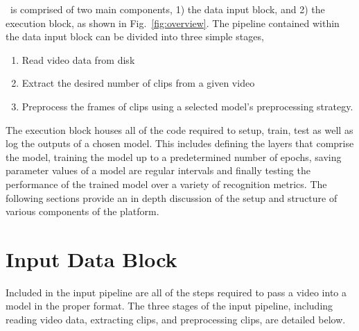 \documentclass{llncs}
\begin{document}
\acro~is comprised of two main components, 1) the data input block, and 2) the execution block, as shown in Fig.~\ref{fig:overview}. 
The pipeline contained within the data input block can be divided into three simple stages,
\begin{enumerate}
\item Read video data from disk
\item Extract the desired number of clips from a given video
\item Preprocess the frames of clips using a selected model's preprocessing strategy.
\end{enumerate}
The execution block houses all of the code required to setup, train, test as well as log the outputs of a chosen model.
This includes defining the layers that comprise the model, training the model up to a predetermined number of epochs, saving parameter values of a model are regular intervals and finally testing the performance of the trained model over a variety of recognition metrics.
The following sections provide an in depth discussion of the setup and structure of various components of the platform.

\section{Input Data Block}
\label{sec:ipblock}
Included in the input pipeline are all of the steps required to pass a video into a model in the proper format.
The three stages of the input pipeline, including reading video data, extracting clips, and preprocessing clips, are detailed below.
\end{document}
